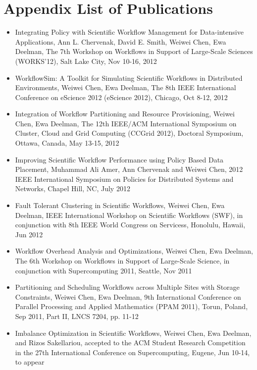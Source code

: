 \chapter*{Appendix\vskip 20pt List of Publications}
\label{ch:listofpublications}


\begin{itemize}
	\item Integrating Policy with Scientific Workflow Management for Data-intensive Applications, Ann L. Chervenak, David E. Smith, Weiwei Chen, Ewa Deelman, The 7th Workshop on Workflows in Support of Large-Scale Sciences (WORKS'12), Salt Lake City, Nov 10-16, 2012
	\item WorkflowSim: A Toolkit for Simulating Scientific Workflows in Distributed Environments, Weiwei Chen, Ewa Deelman, The 8th IEEE International Conference on eScience 2012 (eScience 2012), Chicago, Oct 8-12, 2012
	\item Integration of Workflow Partitioning and Resource Provisioning, Weiwei Chen, Ewa Deelman, The 12th IEEE/ACM International Symposium on Cluster, Cloud and Grid Computing (CCGrid 2012), Doctoral Symposium, Ottawa, Canada, May 13-15, 2012
	\item Improving Scientific Workflow Performance using Policy Based Data Placement, Muhammad Ali Amer, Ann Chervenak and Weiwei Chen, 2012 IEEE International Symposium on Policies for Distributed Systems and Networks, Chapel Hill, NC, July 2012
    \item Fault Tolerant Clustering in Scientific Workflows, Weiwei Chen, Ewa Deelman, IEEE International Workshop on Scientific Workflows (SWF), in conjunction with 8th IEEE World Congress on Servicess, Honolulu, Hawaii, Jun 2012
    \item Workflow Overhead Analysis and Optimizations, Weiwei Chen, Ewa Deelman, The 6th Workshop on Workflows in Support of Large-Scale Science, in conjunction with Supercomputing 2011, Seattle, Nov 2011
    \item Partitioning and Scheduling Workflows across Multiple Sites with Storage Constraints, Weiwei Chen, Ewa Deelman, 9th International Conference on Parallel Processing and Applied Mathematics (PPAM 2011), Torun, Poland, Sep 2011, Part II, LNCS 7204, pp. 11-12
\item Imbalance Optimization in Scientific Workflows, Weiwei Chen, Ewa Deelman, and Rizos Sakellariou, accepted to the ACM Student Research Competition in the 27th International Conference on Supercomputing, Eugene, Jun 10-14, to appear

\end{itemize}